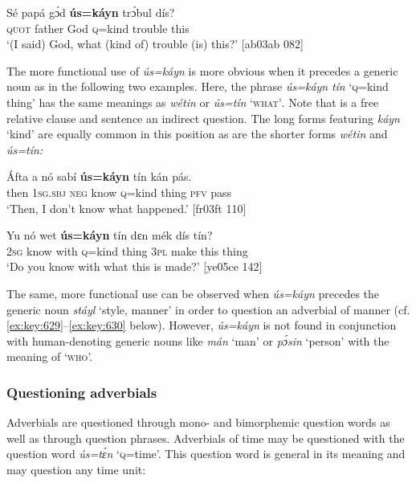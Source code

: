 \ea%
    \label{ex:key:619}
    \gll Sé    papá  gɔ́d  \textbf{ús=káyn}  trɔ́bul  dís?\\
\textsc{quot}    father  God  \textsc{q}=kind  trouble  this\\

\glt ‘(I said) God, what (kind of) trouble (is) this?’ [ab03ab 082]
\z

The more functional use of \textit{ús=káyn} is more obvious when it precedes a generic noun as in the following two examples. Here, the phrase \textit{ús=káyn} \textit{tín} ‘\textsc{q}=kind thing’ has the same meanings as \textit{wétin} or \textit{ús=tín} ‘\textsc{what’}. Note that  is a free relative clause and sentence  an indirect question. The long forms featuring \textit{káyn} ‘kind’ are equally common in this position as are the shorter forms \textit{wétin} and \textit{ús=tín:} 


\ea%
    \label{ex:key:620}
    \gll \'{A}fta    a    nó  sabí    \textbf{ús=káyn}  tín    kán  pás.\\
then  \textsc{1sg.sbj}  \textsc{neg}  know  \textsc{q}=kind  thing  \textsc{pfv}  pass\\

\glt ‘Then, I don’t know what happened.’ [fr03ft 110]
\z


\ea%
    \label{ex:key:621}
    \gll Yu  nó    wet    \textbf{ús=káyn}  tín    dɛn  mék    dís  tín?\\
\textsc{2sg}  know  with    \textsc{q}=kind  thing  \textsc{3pl}  make  this  thing\\

\glt ‘Do you know with what this is made?’ [ye05ce 142]
\z

The same, more functional use can be observed when \textit{ús=káyn} precedes the generic noun \textit{stáyl} ‘style, manner’ in order to question an adverbial of manner (cf. \ref{ex:key:629}–\ref{ex:key:630} below). However, \textit{ús=káyn} is not found in conjunction with human-denoting generic nouns like \textit{mán} ‘man’ or \textit{pɔ́sin} ‘person’ with the meaning of ‘\textsc{who’.}

\subsubsection{Questioning adverbials}

Adverbials are questioned through mono- and bimorphemic question words as well as through question phrases. Adverbials of time may be questioned with the question word \textit{ús=tɛ́n} ‘\textsc{q}=time’. This question word is general in its meaning and may question any time unit:


